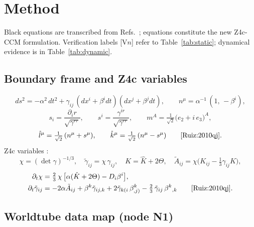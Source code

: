\section{Method}
\label{sec:method}

Black equations are transcribed from Refs.~\cite{Ruiz:2010qj,Moxon:2020gha,Ma:2023qjn};
 equations constitute the new Z4c-CCM formulation. Verification
labels [V$n$] refer to Table~\ref{tab:static}; dynamical evidence is in
Table~\ref{tab:dynamic}.

\subsection{Boundary frame and Z4c variables}
\label{sec:frame}

\begin{equation}
ds^2 = -\alpha^2\,dt^2 + \gamma_{ij}\,(dx^i+\beta^i dt)(dx^j+\beta^j dt),
\qquad
n^\mu = \alpha^{-1}\,(1,\,-\beta^i),
\label{eq:adm}
\end{equation}
\begin{equation}
s_i = \frac{\partial_i r}{\sqrt{\gamma^{rr}}},\qquad
s^i = \frac{\gamma^{ir}}{\sqrt{\gamma^{rr}}},\qquad
m^A = \tfrac{1}{\sqrt{2}}\big(e_2 + i\,e_3\big)^A,
\label{eq:normal}
\end{equation}
\begin{equation}
\mathring{l}^\mu = \tfrac{1}{\sqrt{2}}\,(n^\mu + s^\mu),\qquad
\mathring{k}^\mu = \tfrac{1}{\sqrt{2}}\,(n^\mu - s^\mu)
\qquad\text{\cite{Ruiz:2010qj}}.
\label{eq:nullvecs}
\end{equation}
Z4c variables \cite{Ruiz:2010qj}:
\begin{equation}
\chi = (\det\gamma)^{-1/3},\quad
\tilde\gamma_{ij} = \chi\,\gamma_{ij},\quad
K = \hat K + 2\Theta,\quad
\tilde A_{ij} = \chi\Big(K_{ij}-\tfrac{1}{3}\gamma_{ij}K\Big),
\label{eq:z4cvars}
\end{equation}
\begin{align}
\partial_t \chi &= \tfrac{2}{3}\,\chi\,\big[\alpha(\hat K + 2\Theta) - D_i\beta^i\big],
\label{eq:dtchi}\\
\partial_t \tilde\gamma_{ij} &= -2\alpha \tilde A_{ij}
 + \beta^k \tilde\gamma_{ij,k}
 + 2\tilde\gamma_{k(i}\,\beta^k_{,j)}
 - \tfrac{2}{3}\,\tilde\gamma_{ij}\,\beta^k{}_{,k}
\qquad\text{\cite{Ruiz:2010qj}}.
\label{eq:dtgt}
\end{align}

\subsection{Worldtube data map (node N1)}
\label{sec:n1}

